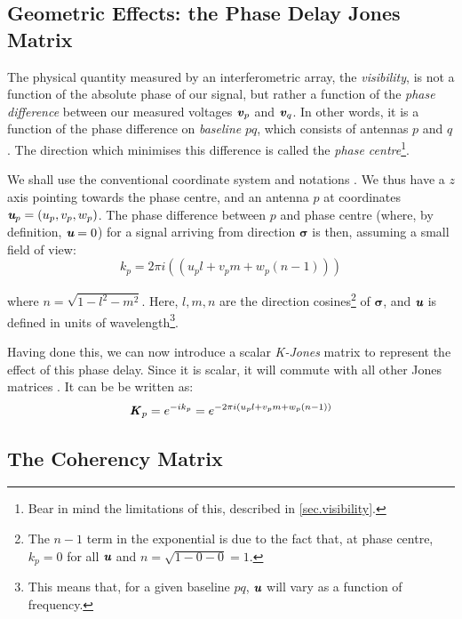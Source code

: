\subsection{Geometric Effects: the Phase Delay Jones Matrix}
\label{section.RIME.JonesChain.Kjones}

\pg
The physical quantity measured by an interferometric array, the \emph{visibility}, is not a function of the absolute phase of our signal, but rather a function of the \emph{phase difference} between our measured voltages $\volt_p$ and $\volt_q$. In other words, it is a function of the phase difference on \emph{baseline} $pq$, which consists of antennas $p$ and $q$. The direction which minimises this difference is called the \emph{phase centre}\footnote{Bear in mind the limitations of this, described in \cref{sec.visibility}.}.

\pg
We shall use the conventional coordinate system and notations . We thus have a $z$ axis pointing towards the phase centre, and an antenna $p$ at coordinates $\U_p=(u_p,v_p,w_p)$. The phase difference between $p$ and phase centre (where, by definition, $\U=0$) for a signal arriving from direction $\pmb{\sigma}$ is then, assuming a small field of view:
\begin{equation}
k_p=2\pi i (( u_p l + v_p m + w_p (n-1) ))
\end{equation}

where $n=\sqrt{1-l^2-m^2}$. Here, $l,m,n$ are the direction cosines\footnote{The $n-1$ term in the exponential is due to the fact that, at phase centre, $k_p=0$ for all $\U$ and $n=\sqrt{1-0-0}=1$.} of $\pmb{\sigma}$, and $\U$ is defined in units of wavelength\footnote{This means that, for a given baseline $pq$, $\U$ will vary as a function of frequency.}.

\pg 
Having done this, we can now introduce a scalar \emph{K-Jones} matrix to represent the effect of this phase delay. Since it is scalar, it will commute with all other Jones matrices . It can be be written as:
\begin{equation}
\Kjones_p = e^{-i k_p}  = e^{-2\pi i ( u_p l + v_p m + w_p (n-1) )}
\end{equation}

\subsection{The Coherency Matrix}
\label{section.RIME.JonesChain.CoherencyMatrix}


